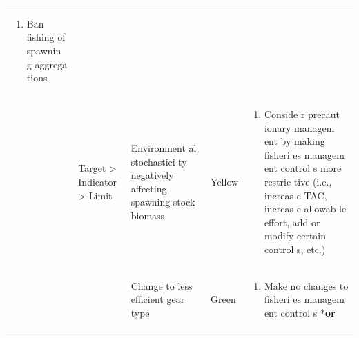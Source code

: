 \documentclass[]{book}
\providecommand{\tightlist}{%
  \setlength{\itemsep}{0pt}\setlength{\parskip}{0pt}}
\begin{document}
\begin{longtable}[]{@{}lllll@{}}
\begin{minipage}[t]{0.19\columnwidth}
\begin{enumerate}
\def\labelenumi{\arabic{enumi}.}
\tightlist
\item
  Ban fishing of spawnin g aggrega tions
\end{enumerate}\strut
\end{minipage}\tabularnewline
\begin{minipage}[t]{0.19\columnwidth}\raggedright\strut
\strut
\end{minipage} & \begin{minipage}[t]{0.19\columnwidth}\raggedright\strut
Target \textgreater{} Indicator \textgreater{} Limit\strut
\end{minipage} & \begin{minipage}[t]{0.19\columnwidth}\raggedright\strut
Environment al stochastici ty negatively affecting spawning stock
biomass\strut
\end{minipage} & \begin{minipage}[t]{0.19\columnwidth}\raggedright\strut
Yellow\strut
\end{minipage} & \begin{minipage}[t]{0.19\columnwidth}\raggedright\strut
\begin{enumerate}
\def\labelenumi{\arabic{enumi}.}
\tightlist
\item
  Conside r precaut ionary managem ent by making fisheri es managem ent
  control s more restric tive (i.e., increas e TAC, increas e allowab le
  effort, add or modify certain control s, etc.)
\end{enumerate}\strut
\end{minipage}\tabularnewline
\begin{minipage}[t]{0.19\columnwidth}\raggedright\strut
\strut
\end{minipage} & \begin{minipage}[t]{0.19\columnwidth}\raggedright\strut
\strut
\end{minipage} & \begin{minipage}[t]{0.19\columnwidth}\raggedright\strut
Change to less efficient gear type\strut
\end{minipage} & \begin{minipage}[t]{0.19\columnwidth}\raggedright\strut
Green\strut
\end{minipage} & \begin{minipage}[t]{0.19\columnwidth}\raggedright\strut
\begin{enumerate}
\def\labelenumi{\arabic{enumi}.}
\tightlist
\item
  Make no changes to fisheri es managem ent control s *\textbf{or}
\end{enumerate}


\end{minipage}
\end{longtable}
\end{document}
